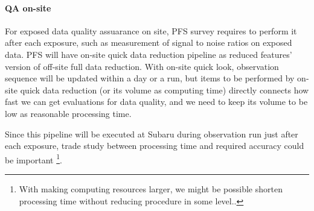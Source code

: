 \documentclass[a4paper,notitlepage]{article}
\begin{document}
%
%
%

\paragraph{QA on-site}
\label{sec:background:survey:qa}

For exposed data quality assuarance on site, 
PFS survey requires to perform it after each exposure, 
such as measurement of signal to noise ratios on exposed data. 
PFS will have on-site quick data reduction pipeline as reduced features' 
version of off-site full data reduction. 
With on-site quick look, observation sequence will be updated within a day 
or a run, but items to be performed by on-site quick data reduction 
(or its volume as computing time) directly 
connects how fast we can get evaluations for data quality, and we need to keep 
its volume to be low as reasonable processing time. 

Since this pipeline will be executed at Subaru during observation run just 
after each exposure, trade study between processing time and required accuracy 
could be important
\footnote{With making computing resources larger, we might be possible shorten 
processing time without reducing procedure in some level..}. 
\end{document}
